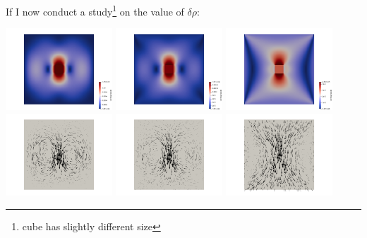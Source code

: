 If I now conduct a study\footnote{cube has slightly different size} on the value of $\delta\rho$:

\begin{center}
\includegraphics[width=4cm]{python_codes/fieldstone_77/results/block/drho/vel1}
\includegraphics[width=4cm]{python_codes/fieldstone_77/results/block/drho/vel3}
\includegraphics[width=4cm]{python_codes/fieldstone_77/results/block/drho/vel2}\\
\includegraphics[width=4cm]{python_codes/fieldstone_77/results/block/drho/vels1}
\includegraphics[width=4cm]{python_codes/fieldstone_77/results/block/drho/vels3}
\includegraphics[width=4cm]{python_codes/fieldstone_77/results/block/drho/vels2}\\

\end{center}

